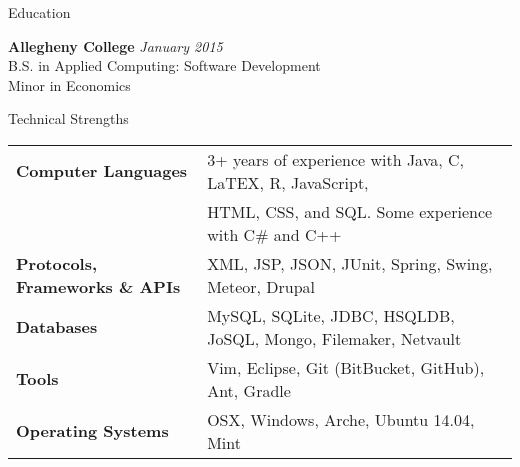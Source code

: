 \documentclass{resume} %
\begin{document}

\begin{rSection}{Education}

{\bf Allegheny College} \hfill {\em January 2015} \\ 
B.S. in Applied Computing: Software Development \\
Minor in Economics %

\end{rSection}

\vspace{-3mm}
\begin{rSection}{Technical Strengths}

\begin{tabular}{ @{} >{\bfseries}l @{\hspace{6ex}} l }
Computer Languages & 3+ years of experience with Java, C, LaTEX, R, JavaScript,\\& HTML, CSS, and SQL.
 Some experience with C\# and C++\\
Protocols, Frameworks \& APIs & XML, JSP, JSON, JUnit, Spring, Swing, Meteor, Drupal \\
Databases & MySQL, SQLite, JDBC, HSQLDB, JoSQL, Mongo, Filemaker, Netvault \\
Tools & Vim, Eclipse, Git (BitBucket, GitHub), Ant, Gradle\\
Operating Systems & OSX, Windows, Arche, Ubuntu 14.04, Mint\\
\end{tabular}
\vspace{-5mm}
\end{rSection}

\end{document}
